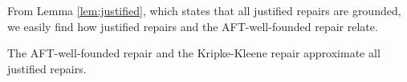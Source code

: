 From Lemma \ref{lem:justified}, which states that all justified repairs are grounded, we easily find how justified repairs and the AFT-well-founded repair relate. 




\begin{corollary}
 The AFT-well-founded repair and the Kripke-Kleene repair approximate all justified repairs. 
\end{corollary}

